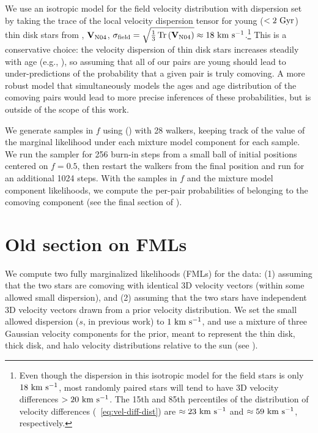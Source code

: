\documentclass[modern, letterpaper]{aastex61}
\DeclareMathOperator{\Tr}{Tr}
\begin{document}
We use an isotropic model for the field velocity distribution with dispersion
set by taking the trace of the local velocity dispersion tensor for young
($<2~{\rm Gyr}$) thin disk stars from \citealt{Nordstrom:2004}, $\mathbf{V}_{\rm
N04}$, $\sigma_{\rm field} =
\sqrt{\frac{1}{3}\Tr{\left(\mat{V}_{\rm N04}\right)}} \approx
18~\kms$.\footnote{Even though the dispersion in this isotropic model for the
field stars is only $18~\mathrm{km}~\mathrm{s}^{-1}$, most randomly paired stars will tend to have 3D
velocity differences $>20~\mathrm{km}~\mathrm{s}^{-1}$. The 15th and 85th percentiles of the
distribution of velocity differences (\eqname~\ref{eq:vel-diff-dist}) are
$\approx 23~\mathrm{km}~\mathrm{s}^{-1}$ and $\approx 59~\mathrm{km}~\mathrm{s}^{-1}$, respectively.}
This is a conservative choice: the velocity dispersion of thin disk stars
increases steadily with age (e.g., \citealt{Aumer:2016}), so assuming that all
of our pairs are young should lead to under-predictions of the probability that
a given pair is truly comoving.
A more robust model that simultaneously models the ages and age distribution of
the comoving pairs would lead to more precise inferences of these probabilities,
but is outside of the scope of this work.

We generate samples in $f$ using  (\citealt{Foreman-Mackey:2013})
with 28 walkers, keeping track of the value of the marginal likelihood under
each mixture model component for each sample.
We run the sampler for 256 burn-in steps from a small ball of initial positions
centered on $f=0.5$, then restart the walkers from the final position and run
for an additional 1024 steps.
With the samples in $f$ and the mixture model component likelihoods, we compute
the per-pair probabilities of belonging to the comoving component (see the final
section of \citealt{Foreman-Mackey:2014}).


\section{Old section on FMLs}
We compute two fully marginalized likelihoods (FMLs) for the data: (1) assuming
that the two stars are comoving with identical 3D velocity vectors (within some
allowed small dispersion), and (2) assuming that the two stars have independent
3D velocity vectors drawn from a prior velocity distribution.
We set the small allowed dispersion ($s$, in previous work) to $1~\mathrm{km}~\mathrm{s}^{-1}$, and use
a mixture of three Gaussian velocity components for the prior, meant to
represent the thin disk, thick disk, and halo velocity distributions relative to
the sun (see \citealt{Oh:2017}).
\end{document}
